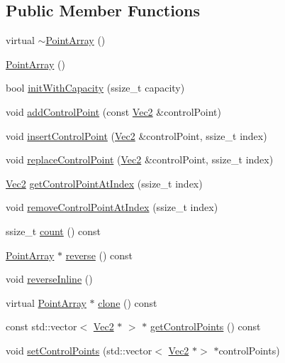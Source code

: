 \subsection*{Public Member Functions}
\begin{DoxyCompactItemize}
\item 
virtual \hyperlink{classPointArray_ab5705c1774f3d3945edcf6f3d0a6ee0c}{$\sim$\+Point\+Array} ()
\item 
\hyperlink{classPointArray_a508483dca6a6a6333ce3cc379eaa6307}{Point\+Array} ()
\item 
bool \hyperlink{classPointArray_a3b4567bbb7c2eed2f01d6331397f3858}{init\+With\+Capacity} (ssize\+\_\+t capacity)
\item 
void \hyperlink{classPointArray_af2994ad7c7fcd61f42a97dc69e1bda99}{add\+Control\+Point} (const \hyperlink{classVec2}{Vec2} \&control\+Point)
\item 
void \hyperlink{classPointArray_a4ab1fa2466f44c89383a6121bbcbc077}{insert\+Control\+Point} (\hyperlink{classVec2}{Vec2} \&control\+Point, ssize\+\_\+t index)
\item 
void \hyperlink{classPointArray_a09527fab6aab5ff7a8ef14cad3fdb287}{replace\+Control\+Point} (\hyperlink{classVec2}{Vec2} \&control\+Point, ssize\+\_\+t index)
\item 
\hyperlink{classVec2}{Vec2} \hyperlink{classPointArray_ab9191dfd0c29eb99bb5fa586fc76f72b}{get\+Control\+Point\+At\+Index} (ssize\+\_\+t index)
\item 
void \hyperlink{classPointArray_aadb3246ab7be6a4ccce90a3847ad5da0}{remove\+Control\+Point\+At\+Index} (ssize\+\_\+t index)
\item 
ssize\+\_\+t \hyperlink{classPointArray_acb504dfc029d3437c570c88712d704b2}{count} () const
\item 
\hyperlink{classPointArray}{Point\+Array} $\ast$ \hyperlink{classPointArray_aff4902e67a82db5e0258b4a8d9587235}{reverse} () const
\item 
void \hyperlink{classPointArray_a0b1712afca2d1c5f912929f1fcd8eb2d}{reverse\+Inline} ()
\item 
virtual \hyperlink{classPointArray}{Point\+Array} $\ast$ \hyperlink{classPointArray_aa8b6e9b63e2652488a4225561f2f8487}{clone} () const
\item 
const std\+::vector$<$ \hyperlink{classVec2}{Vec2} $\ast$ $>$ $\ast$ \hyperlink{classPointArray_a7eb8e79549b923d061e90f8fc3a34425}{get\+Control\+Points} () const
\item 
void \hyperlink{classPointArray_a494eaba68f33da1e1a47f0619a74a488}{set\+Control\+Points} (std\+::vector$<$ \hyperlink{classVec2}{Vec2} $\ast$$>$ $\ast$control\+Points)
$$
\end{DoxyCompactItemize}
